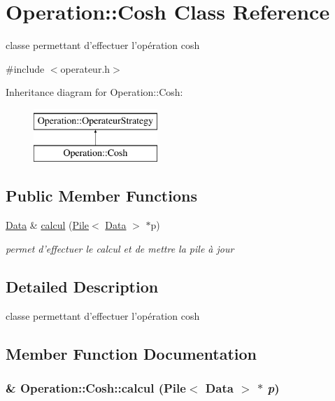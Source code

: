 \hypertarget{classOperation_1_1Cosh}{
\section{Operation::Cosh Class Reference}
\label{classOperation_1_1Cosh}
}


classe permettant d'effectuer l'opération cosh  




{\ttfamily \#include $<$operateur.h$>$}

Inheritance diagram for Operation::Cosh:\begin{figure}[H]
\begin{center}
\leavevmode
\includegraphics[height=2cm]{classOperation_1_1Cosh}
\end{center}
\end{figure}
\subsection*{Public Member Functions}
\begin{DoxyCompactItemize}
\item 
\hyperlink{classNombre_1_1Data}{Data} \& \hyperlink{classOperation_1_1Cosh_a36990c65bccdadf30a8e3b967feb8d3a}{calcul} (\hyperlink{classPile}{Pile}$<$ \hyperlink{classNombre_1_1Data}{Data} $>$ $\ast$p)
\begin{DoxyCompactList}\small\item\em permet d'effectuer le calcul et de mettre la pile à jour \item\end{DoxyCompactList}\end{DoxyCompactItemize}


\subsection{Detailed Description}
classe permettant d'effectuer l'opération cosh 

\subsection{Member Function Documentation}
\hypertarget{classOperation_1_1Cosh_a36990c65bccdadf30a8e3b967feb8d3a}{
\subsubsection[{calcul}]{\& Operation::Cosh::calcul ({\bf Pile}$<$ {\bf Data} $>$ $\ast$ {\em p})}}
\label{classOperation_1_1Cosh_a36990c65bccdadf30a8e3b967feb8d3a}


